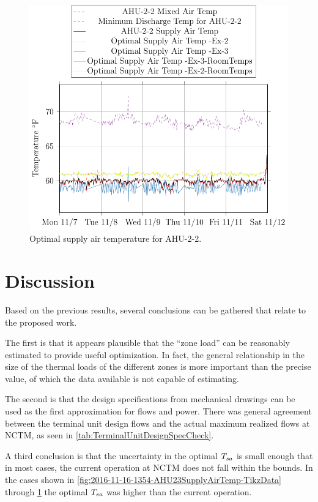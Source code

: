 \begin{figure}
\centering
\includegraphics[]{Plots/2016-11-16-1636-AHU22MixedAirTemp-TikzData.pdf}
\caption{Optimal supply air temperature for AHU-2-2.}
\label{fig:2016-11-16-1636-AHU22MixedAirTemp-TikzData}
\end{figure}

\section{Discussion}

Based on the previous results, several conclusions can be gathered that relate to the proposed work.

The first is that it appears plausible that the ``zone load'' can be reasonably estimated to provide useful optimization.
In fact, the general relationship in the size of the thermal loads of the different zones is more important than the precise value, of which the data available is not capable of estimating. 

The second is that the design specifications from mechanical drawings can be used as the first approximation for flows and power.
There was general agreement between the terminal unit design flows and the actual maximum realized flows at NCTM, as seen in \tableref{} \ref{tab:TerminalUnitDesignSpecCheck}. 

A third conclusion is that the uncertainty in the optimal \(T_{sa}\) is small enough that in most cases, the current operation at NCTM does not fall within the bounds.
In the cases shown in \figref{} \ref{fig:2016-11-16-1354-AHU23SupplyAirTemp-TikzData} through \figref{} \ref{fig:2016-11-16-1636-AHU22MixedAirTemp-TikzData} the optimal \(T_{sa}\) was higher than the current operation. 
